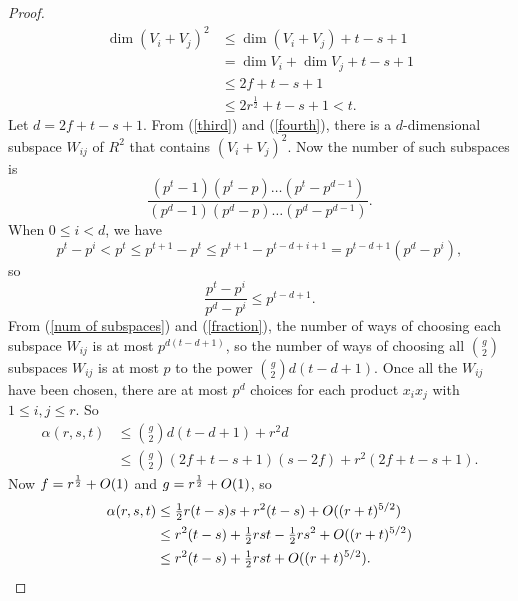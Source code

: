 \documentclass[12pt]{article}
\begin{document}
\begin{proof}
\begin{align}
\dim(V_{i} + V_{j})^{2} & \leq \dim(V_{i} + V_{j}) + t - s + 1 \nonumber \\
{} & = \dim V_{i} + \dim V_{j} + t - s + 1  \nonumber \\
{} & \leq 2f + t - s + 1  \label{third}  \\
{} & \leq 2r^{\frac{1}{2}} + t - s + 1 < t. \label{fourth}
\end{align}
Let $d = 2f + t - s + 1$. From (\ref{third}) and (\ref{fourth}), there is a $d$-dimensional subspace $W_{ij}$ of $R^{2}$ that contains $(V_{i} + V_{j})^{2}$. Now the number of such subspaces is
\begin{equation} \label{num of subspaces}
\frac{(p^{t} - 1)(p^{t} - p) \ldots (p^{t} - p^{d-1})}{(p^{d} - 1)(p^{d} - p) \ldots (p^{d} - p^{d-1})}.
\end{equation}
When $0 \leq i < d$, we have
\begin{displaymath}
p^{t} - p^{i} < p^{t} \leq p^{t+1} - p^{t} \leq p^{t+1} - p^{t-d+i+1} = p^{t-d+1}(p^{d}- p^{i}),
\end{displaymath}
so
\begin{equation} \label{fraction}
\frac{p^{t} - p^{i}}{p^{d} - p^{i}} \leq p^{t-d+1}.
\end{equation}
From (\ref{num of subspaces}) and (\ref{fraction}), the number of ways of choosing each subspace $W_{ij}$ is at most $p^{d(t-d+1)}$, so the number of ways of choosing all $\binom{g}{2}$ subspaces $W_{ij}$ is at most $p$ to the power $\binom{g}{2}d(t - d + 1)$. Once all the $W_{ij}$ have been chosen, there are at most $p^{d}$ choices for each product $x_{i}x_{j}$ with $1 \leq i, j \leq r$. So 
\begin{align*}
\alpha(r, s, t) & \leq \binom{g}{2}d(t - d + 1) + r^{2}d \\
{} & \leq \binom{g}{2}(2f + t - s + 1)(s - 2f) + r^{2}(2f + t - s + 1).
\end{align*} 
Now $f = r^{\frac{1}{2}} + \mathnormal{O}(1)$ and $g = r^{\frac{1}{2}} + \mathnormal{O}(1)$, so
\begin{align*}
\alpha(r, s, t) & \leq \tfrac{1}{2}r(t - s)s + r^{2}(t - s) + \mathnormal{O}((r + t)^{5/2}) \\
{} & \leq r^{2}(t - s) + \tfrac{1}{2}rst - \tfrac{1}{2}rs^{2} + \mathnormal{O}((r + t)^{5/2}) \\
{} & \leq r^{2}(t - s) + \tfrac{1}{2}rst  + \mathnormal{O}((r + t)^{5/2}).\qedhere
\end{align*}
\end{proof}
\end{document}
